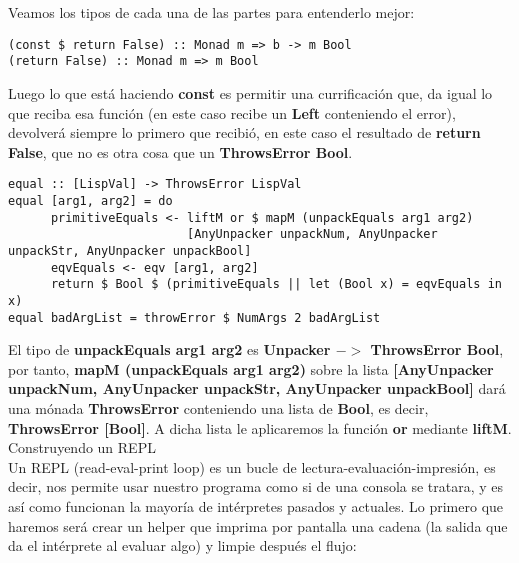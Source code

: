 Veamos los tipos de cada una de las partes para entenderlo mejor:\\

\begin{minipage}{\linewidth}
\begin{footnotesize}
\begin{lstlisting}[frame=single]
(const $ return False) :: Monad m => b -> m Bool
(return False) :: Monad m => m Bool
\end{lstlisting}
\end{footnotesize}
\end{minipage}

Luego lo que est\'a haciendo \textbf{const} es permitir una currificaci\'on que, da igual lo que reciba esa funci\'on (en este caso recibe un \textbf{Left} conteniendo el error), devolver\'a siempre lo primero que recibi\'o, en este caso el resultado de \textbf{return False}, que no es otra cosa que un \textbf{ThrowsError Bool}.

\begin{minipage}{\linewidth}
\begin{tiny}
\begin{lstlisting}[frame=single]
equal :: [LispVal] -> ThrowsError LispVal
equal [arg1, arg2] = do
      primitiveEquals <- liftM or $ mapM (unpackEquals arg1 arg2) 
                         [AnyUnpacker unpackNum, AnyUnpacker unpackStr, AnyUnpacker unpackBool]
      eqvEquals <- eqv [arg1, arg2]
      return $ Bool $ (primitiveEquals || let (Bool x) = eqvEquals in x)
equal badArgList = throwError $ NumArgs 2 badArgList
\end{lstlisting}
\end{tiny}
\end{minipage}

El tipo de \textbf{unpackEquals arg1 arg2} es \textbf{Unpacker $-\!>$ ThrowsError Bool}, por tanto, \textbf{mapM (unpackEquals arg1 arg2)} sobre la lista \textbf{[AnyUnpacker unpackNum, AnyUnpacker unpackStr, AnyUnpacker unpackBool]} dar\'a una m\'onada \textbf{ThrowsError} conteniendo una lista de \textbf{Bool}, es decir, \textbf{ThrowsError [Bool]}. A dicha lista le aplicaremos la funci\'on \textbf{or} mediante \textbf{liftM}.\\

Construyendo un REPL\\

Un REPL (read-eval-print loop) es un bucle de lectura-evaluaci\'on-impresi\'on, es decir, nos permite usar nuestro programa como si de una consola se tratara, y es as\'i como funcionan la mayor\'ia de int\'erpretes pasados y actuales. Lo primero que haremos ser\'a crear un helper que imprima por pantalla una cadena (la salida que da el int\'erprete al evaluar algo) y limpie despu\'es el flujo:\\

